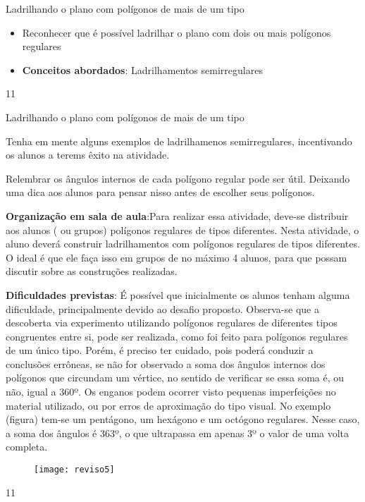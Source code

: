 \cleardoublepage
\def\currentcolor{session1}
\begin{objectives}{Ladrilhando o plano com polígonos de mais de um tipo}
{
	\begin{itemize}
	\item Reconhecer que é possível ladrilhar o plano com dois ou mais polígonos regulares
	\item \textbf{Conceitos abordados}: Ladrilhamentos semirregulares
	\end{itemize}
}{1}{1}
\end{objectives}
\begin{sugestions}{Ladrilhando o plano com polígonos de mais de um tipo}
{
Tenha  em mente alguns exemplos de ladrilhamenos semirregulares, incentivando os alunos a terems êxito na  atividade.

Relembrar os ângulos internos de cada polígono regular pode ser útil. Deixando uma dica aos alunos para pensar nisso antes de escolher seus polígonos.

\textbf{Organização em sala de aula}:Para realizar essa atividade, deve-se distribuir aos alunos ( ou grupos) polígonos regulares de tipos diferentes. Nesta atividade, o aluno deverá construir ladrilhamentos com polígonos regulares de tipos diferentes. O ideal é que ele faça isso em grupos de no máximo 4 alunos, para que possam discutir sobre as construções realizadas. 

\textbf{Dificuldades previstas}: É possível que inicialmente os alunos tenham alguma dificuldade, principalmente devido ao desafio proposto. Observa-se que a descoberta via experimento utilizando polígonos regulares de diferentes tipos congruentes entre si, pode ser realizada, como foi feito para polígonos regulares de um único tipo. Porém, é preciso ter cuidado, pois poderá conduzir a conclusões errôneas, se não for observado a soma dos ângulos internos dos polígonos que circundam um vértice, no sentido de verificar se essa soma é, ou não, igual a 360º. Os enganos podem ocorrer visto pequenas imperfeições no material utilizado, ou por erros de aproximação do tipo visual. No exemplo (figura) tem-se um pentágono, um hexágono e um octógono regulares. Nesse caso, a soma dos ângulos é 363º, o que ultrapassa em apenas 3º o valor de uma volta completa.

\begin{figure}[H]
\centering

\texttt{[image: reviso5]}
\end{figure}

}{1}{1}
\end{sugestions}
